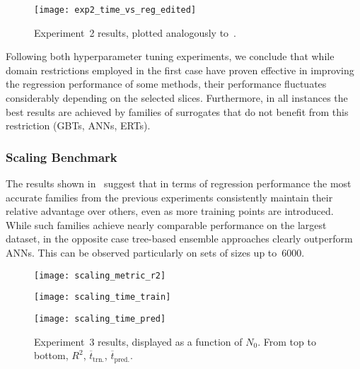 \begin{figure}
	\centering

	\hspace*{-0.1\columnwidth}
	\texttt{[image: exp2\_time\_vs\_reg\_edited]}
	\caption{\label{fig:exp2-time-vs-reg}Experiment~2 results, plotted analogously
	to~.}
\end{figure}

Following both hyperparameter tuning experiments, we conclude that while domain
restrictions employed in the first case have proven effective in improving the
regression performance of some methods, their performance fluctuates considerably
depending on the selected slices. Furthermore, in all instances the best
results are achieved by families of surrogates that do not benefit from this
restriction (GBTs, ANNs, ERTs).


\subsubsection{Scaling Benchmark}
\label{sec:res-exp3}

The results shown in~ suggest that in terms of regression
performance the most accurate families from the previous experiments
consistently maintain their relative advantage over others, even as
more training points are introduced. While such families achieve nearly comparable
performance on the largest dataset, in the opposite case tree-based ensemble approaches
clearly outperform ANNs. This can be observed
particularly on sets of sizes up to~\num{6000}.

\begin{figure}
	\centering
	\hspace*{-0.1\columnwidth}
	\texttt{[image: scaling\_metric\_r2]}
	
	\vfill

	\hspace*{-0.1\columnwidth}
	\texttt{[image: scaling\_time\_train]}
	
	\vfill

	\hspace*{-0.1\columnwidth}
	\texttt{[image: scaling\_time\_pred]}
	\caption{Experiment~3 results, displayed as a function of $N_0$. From top to bottom, $R^2$,
	$\overline{t}_{\text{trn.}}$, $\overline{t}_{\text{pred.}}$.}
	\label{fig:scaling}
\end{figure}

